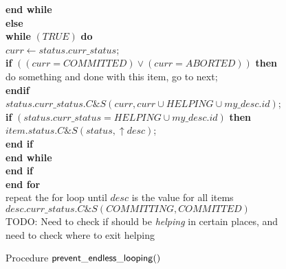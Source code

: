 \documentclass[11pt]{article}
\begin{document}
\begin{figure}[htb]
{{\begin{minipage}[t]{150mm}
\begin{tabbing}
 \>\>\> {\bf end while} \\

 \>\> {\bf else} \\

 \>\>\> {\bf while} $(\mathit{TRUE})$ {\bf do} \\

 \>\>\>\> $curr \gets status.curr\_status$; \\

 \>\>\>\> {\bf if} $((curr = \mathit{COMMITTED}) \vee (curr = \mathit{ABORTED}))$ {\bf then} \\

 \>\>\>\>\> do something and done with this item, go to next; \\

 \>\>\>\> {\bf endif} \\

 \>\>\>\> $status.curr\_status.C\&S(curr, curr \cup \mathit{HELPING} \cup my\_desc.id)$; \\

 \>\>\>\> {\bf if} $(status.curr\_status = \mathit{HELPING} \cup my\_desc.id)$ {\bf then} \\

 \>\>\>\>\> $item.status.C\&S(status, \uparrow desc)$; \\

 \>\>\>\> {\bf end if} \\

 \>\>\> {\bf end while} \\

 \>\> {\bf end if} \\

 \> {\bf end for} \\

 \> repeat the for loop until $desc$ is the value for all items \\

 \> $desc.curr\_status.C\&S(\mathit{COMMITTING}, COMMITTED)$ \\

 \>  TODO: Need to check if should be \emph{helping} in certain places, and need to check where to exit helping


\end{tabbing}
\normalsize
\end{minipage}
}
\caption{Procedure  ${\sf prevent\_endless\_looping}()$}
\label{fig-prevent-looping}
}
\end{figure}





\end{document}

